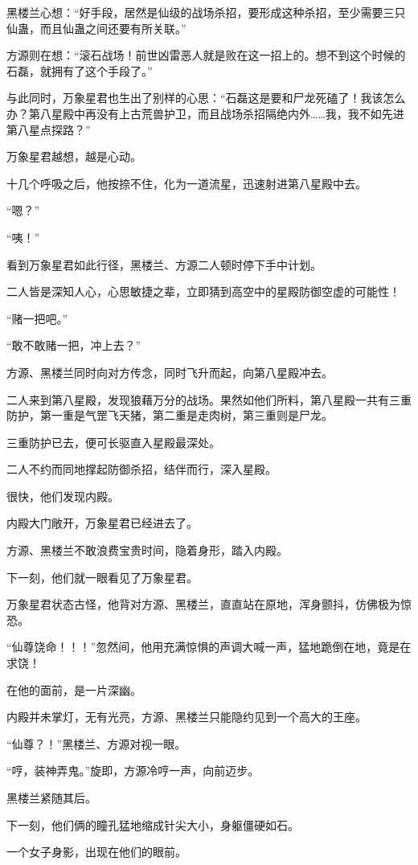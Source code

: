 \begin{this_body}
黑楼兰心想：“好手段，居然是仙级的战场杀招，要形成这种杀招，至少需要三只仙蛊，而且仙蛊之间还要有所关联。”

方源则在想：“滚石战场！前世凶雷恶人就是败在这一招上的。想不到这个时候的石磊，就拥有了这个手段了。”

与此同时，万象星君也生出了别样的心思：“石磊这是要和尸龙死磕了！我该怎么办？第八星殿中再没有上古荒兽护卫，而且战场杀招隔绝内外……我，我不如先进第八星点探路？”

万象星君越想，越是心动。

十几个呼吸之后，他按捺不住，化为一道流星，迅速射进第八星殿中去。

“嗯？”

“咦！”

看到万象星君如此行径，黑楼兰、方源二人顿时停下手中计划。

二人皆是深知人心，心思敏捷之辈，立即猜到高空中的星殿防御空虚的可能性！

“赌一把吧。”

“敢不敢赌一把，冲上去？”

方源、黑楼兰同时向对方传念，同时飞升而起，向第八星殿冲去。

二人来到第八星殿，发现狼藉万分的战场。果然如他们所料，第八星殿一共有三重防护，第一重是气罡飞天猪，第二重是走肉树，第三重则是尸龙。

三重防护已去，便可长驱直入星殿最深处。

二人不约而同地撑起防御杀招，结伴而行，深入星殿。

很快，他们发现内殿。

内殿大门敞开，万象星君已经进去了。

方源、黑楼兰不敢浪费宝贵时间，隐着身形，踏入内殿。

下一刻，他们就一眼看见了万象星君。

万象星君状态古怪，他背对方源、黑楼兰，直直站在原地，浑身颤抖，仿佛极为惊恐。

“仙尊饶命！！！”忽然间，他用充满惊惧的声调大喊一声，猛地跪倒在地，竟是在求饶！

在他的面前，是一片深幽。

内殿并未掌灯，无有光亮，方源、黑楼兰只能隐约见到一个高大的王座。

“仙尊？！”黑楼兰、方源对视一眼。

“哼，装神弄鬼。”旋即，方源冷哼一声，向前迈步。

黑楼兰紧随其后。

下一刻，他们俩的瞳孔猛地缩成针尖大小，身躯僵硬如石。

一个女子身影，出现在他们的眼前。


\end{this_body}
